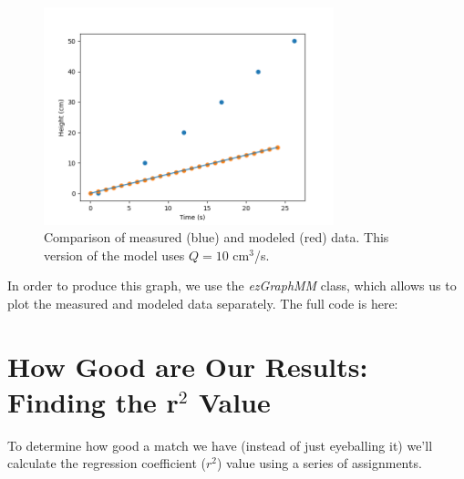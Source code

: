 \documentclass[11pt,fleqn]{book}
\begin{document}
	\begin{figure}[h!]
		\begin{center}
		\includegraphics[width=0.75\textwidth]{filling-calibration-Q=10.png}
		\caption{Comparison of measured (blue) and modeled (red) data. This version of the model uses $Q=10$ cm$^3$/s.}
		\end{center}
	\end{figure}
	
	In order to produce this graph, we use the \textit{ezGraphMM} class, which allows us to plot the measured and modeled data separately. The full code is here:
	\vspace{1em}
	
	
	
	
	\section{How Good are Our Results: Finding the r$^2$ Value}
	
		To determine how good a match we have (instead of just eyeballing it) we'll calculate the regression coefficient ($r^2$) value using a series of assignments.
		
\end{document}
